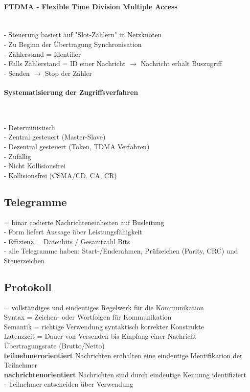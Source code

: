 \documentclass{article}
\newcommand{\myparagraph}[1]{\paragraph{#1}\mbox{}\\}
\newcommand{\follows}{$\rightarrow$ }
\begin{document}
	\myparagraph{FTDMA - Flexible Time Division Multiple Access}
	- Steuerung basiert auf "Slot-Zählern" in Netzknoten \\
	- Zu Beginn der Übertragung Synchronisation \\
	- Zählerstand = Identifier \\
	- Falls Zählerstand = ID einer Nachricht \follows Nachricht erhält Buszugriff \\
	- Senden \follows Stop der Zähler \\
	
	\myparagraph{Systematisierung der Zugriffsverfahren}
	\begin{tabbing}
	- \= Deterministisch \\
	\> - Zentral gesteuert (Master-Slave) \\
	\> - Dezentral gesteuert (Token, TDMA Verfahren) \\
	- Zufällig \\
	\> - Nicht Kollisionsfrei \\
	\> - Kollisionsfrei (CSMA/CD, CA, CR)
	\end{tabbing}
	
	
	\subsection{Telegramme}
	= binär codierte Nachrichteneinheiten auf Busleitung \\
	- Form liefert Aussage über Leistungsfähigkeit \\
	- Effizienz = Datenbits / Gesamtzahl Bits \\
	- alle Telegramme haben: Start-/Enderahmen, Prüfzeichen (Parity, CRC) und Steuerzeichen
	
	\subsection{Protokoll}
	= vollständiges und eindeutiges Regelwerk für die Kommunikation \\
	Syntax = Zeichen- oder Wortfolgen für Kommunikation \\
	Semantik = richtige Verwendung syntaktisch korrekter Konstrukte \\
	Latenzzeit = Dauer von Versenden bis Empfang einer Nachricht \\
	Übertragungsrate (Brutto/Netto) \\
	\textbf{teilnehmerorientiert} Nachrichten enthalten eine eindeutige Identifikation der Teilnehmer \\
	\textbf{nachrichtenorientiert} Nachrichten sind durch eindeutige Kennung identifiziert - Teilnehmer entscheiden über Verwendung
	
\end{document}
